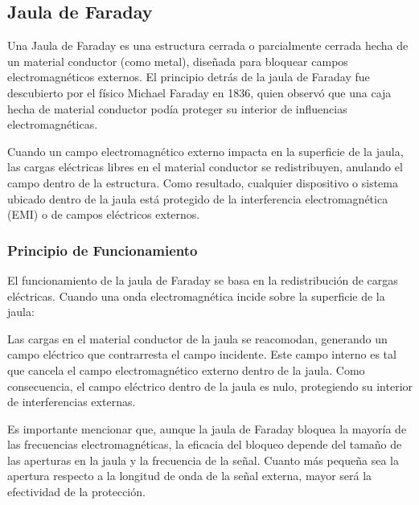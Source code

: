 \documentclass{article}
\begin{document}
\subsection{Jaula de Faraday}
Una Jaula de Faraday es una estructura cerrada o parcialmente cerrada hecha de un material conductor (como metal), diseñada para bloquear campos electromagnéticos externos. El principio detrás de la jaula de Faraday fue descubierto por el físico Michael Faraday en 1836, quien observó que una caja hecha de material conductor podía proteger su interior de influencias electromagnéticas.

Cuando un campo electromagnético externo impacta en la superficie de la jaula, las cargas eléctricas libres en el material conductor se redistribuyen, anulando el campo dentro de la estructura. Como resultado, cualquier dispositivo o sistema ubicado dentro de la jaula está protegido de la interferencia electromagnética (EMI) o de campos eléctricos externos.

\subsubsection{Principio de Funcionamiento}
El funcionamiento de la jaula de Faraday se basa en la redistribución de cargas eléctricas. Cuando una onda electromagnética incide sobre la superficie de la jaula:

    Las cargas en el material conductor de la jaula se reacomodan, generando un campo eléctrico que contrarresta el campo incidente. Este campo interno es tal que cancela el campo electromagnético externo dentro de la jaula. Como consecuencia, el campo eléctrico dentro de la jaula es nulo, protegiendo su interior de interferencias externas.

Es importante mencionar que, aunque la jaula de Faraday bloquea la mayoría de las frecuencias electromagnéticas, la eficacia del bloqueo depende del tamaño de las aperturas en la jaula y la frecuencia de la señal. Cuanto más pequeña sea la apertura respecto a la longitud de onda de la señal externa, mayor será la efectividad de la protección.
\end{document}
